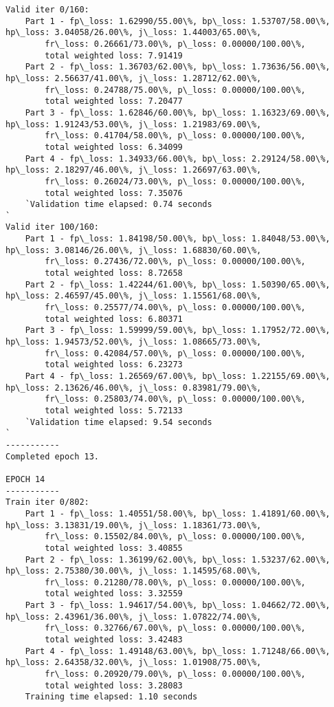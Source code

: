 \documentclass[11pt]{article}
\begin{document}
\begin{Verbatim}[commandchars=\\\{\}]
Valid iter 0/160:
	Part 1 - fp\_loss: 1.62990/55.00\%, bp\_loss: 1.53707/58.00\%, hp\_loss: 3.04058/26.00\%, j\_loss: 1.44003/65.00\%, 
		fr\_loss: 0.26661/73.00\%, p\_loss: 0.00000/100.00\%, 
		total weighted loss: 7.91419
	Part 2 - fp\_loss: 1.36703/62.00\%, bp\_loss: 1.73636/56.00\%, hp\_loss: 2.56637/41.00\%, j\_loss: 1.28712/62.00\%, 
		fr\_loss: 0.24788/75.00\%, p\_loss: 0.00000/100.00\%, 
		total weighted loss: 7.20477
	Part 3 - fp\_loss: 1.62846/60.00\%, bp\_loss: 1.16323/69.00\%, hp\_loss: 1.91243/53.00\%, j\_loss: 1.21983/69.00\%, 
		fr\_loss: 0.41704/58.00\%, p\_loss: 0.00000/100.00\%, 
		total weighted loss: 6.34099
	Part 4 - fp\_loss: 1.34933/66.00\%, bp\_loss: 2.29124/58.00\%, hp\_loss: 2.18297/46.00\%, j\_loss: 1.26697/63.00\%, 
		fr\_loss: 0.26024/73.00\%, p\_loss: 0.00000/100.00\%, 
		total weighted loss: 7.35076
	`Validation time elapsed: 0.74 seconds
`
Valid iter 100/160:
	Part 1 - fp\_loss: 1.84198/50.00\%, bp\_loss: 1.84048/53.00\%, hp\_loss: 3.08146/26.00\%, j\_loss: 1.68830/60.00\%, 
		fr\_loss: 0.27436/72.00\%, p\_loss: 0.00000/100.00\%, 
		total weighted loss: 8.72658
	Part 2 - fp\_loss: 1.42244/61.00\%, bp\_loss: 1.50390/65.00\%, hp\_loss: 2.46597/45.00\%, j\_loss: 1.15561/68.00\%, 
		fr\_loss: 0.25577/74.00\%, p\_loss: 0.00000/100.00\%, 
		total weighted loss: 6.80371
	Part 3 - fp\_loss: 1.59999/59.00\%, bp\_loss: 1.17952/72.00\%, hp\_loss: 1.94573/52.00\%, j\_loss: 1.08665/73.00\%, 
		fr\_loss: 0.42084/57.00\%, p\_loss: 0.00000/100.00\%, 
		total weighted loss: 6.23273
	Part 4 - fp\_loss: 1.26569/67.00\%, bp\_loss: 1.22155/69.00\%, hp\_loss: 2.13626/46.00\%, j\_loss: 0.83981/79.00\%, 
		fr\_loss: 0.25803/74.00\%, p\_loss: 0.00000/100.00\%, 
		total weighted loss: 5.72133
	`Validation time elapsed: 9.54 seconds
`
-----------
Completed epoch 13.

EPOCH 14
-----------
Train iter 0/802:
	Part 1 - fp\_loss: 1.40551/58.00\%, bp\_loss: 1.41891/60.00\%, hp\_loss: 3.13831/19.00\%, j\_loss: 1.18361/73.00\%, 
		fr\_loss: 0.15502/84.00\%, p\_loss: 0.00000/100.00\%, 
		total weighted loss: 3.40855
	Part 2 - fp\_loss: 1.36199/62.00\%, bp\_loss: 1.53237/62.00\%, hp\_loss: 2.75380/30.00\%, j\_loss: 1.14595/68.00\%, 
		fr\_loss: 0.21280/78.00\%, p\_loss: 0.00000/100.00\%, 
		total weighted loss: 3.32559
	Part 3 - fp\_loss: 1.94617/54.00\%, bp\_loss: 1.04662/72.00\%, hp\_loss: 2.43961/36.00\%, j\_loss: 1.07822/74.00\%, 
		fr\_loss: 0.32766/67.00\%, p\_loss: 0.00000/100.00\%, 
		total weighted loss: 3.42483
	Part 4 - fp\_loss: 1.49148/63.00\%, bp\_loss: 1.71248/66.00\%, hp\_loss: 2.64358/32.00\%, j\_loss: 1.01908/75.00\%, 
		fr\_loss: 0.20920/79.00\%, p\_loss: 0.00000/100.00\%, 
		total weighted loss: 3.28083
	Training time elapsed: 1.10 seconds


\end{Verbatim}
\end{document}
